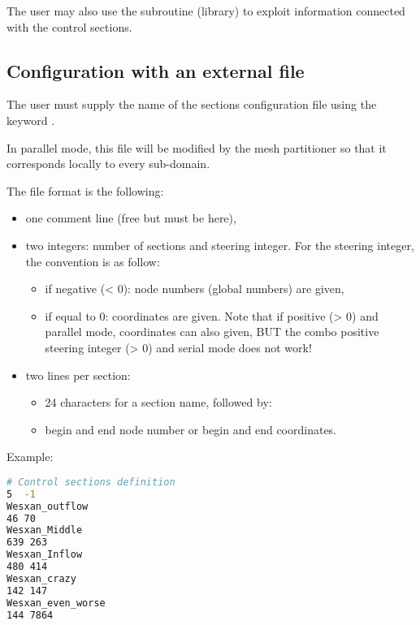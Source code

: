 The user may also use the subroutine  (\bief library)
to exploit information connected with the control sections.


\subsection{Configuration with an external file}

The user must supply the name of the sections configuration file
using the keyword .

In parallel mode, this file will be modified by the mesh partitioner
so that it corresponds locally to every sub-domain.

The file format is the following:

\begin{itemize}
\item one comment line (free but must be here),

\item two integers: number of sections and steering integer.
For the steering integer, the convention is as follow:
  \begin{itemize}
  \item if negative (< 0): node numbers (global numbers) are given,
  \item if equal to 0: coordinates are given.
Note that if positive (> 0) and parallel mode, coordinates can also given,
BUT the combo positive steering integer (> 0) and serial mode does not work!
  \end{itemize}

\item two lines per section:

\begin{itemize}

\item 24 characters for a section name, followed by:

\item begin and end node number or begin and end coordinates.

\end{itemize}
\end{itemize}

Example:
\begin{lstlisting}[language=bash]
# Control sections definition
5  -1
Wesxan_outflow
46 70
Wesxan_Middle
639 263
Wesxan_Inflow
480 414
Wesxan_crazy
142 147
Wesxan_even_worse
144 7864
\end{lstlisting}

